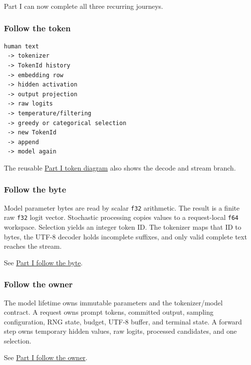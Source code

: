 \documentclass[
  10pt,
]{article}
\begin{document}
Part I can now complete all three recurring journeys.

\subsubsection{Follow the token}\label{follow-the-token-1}

\begin{verbatim}
human text
 -> tokenizer
 -> TokenId history
 -> embedding row
 -> hidden activation
 -> output projection
 -> raw logits
 -> temperature/filtering
 -> greedy or categorical selection
 -> new TokenId
 -> append
 -> model again
\end{verbatim}

The reusable
\href{https://github.com/hermonai/inside-the-llm-engine/blob/astra-visual-rewrite/diagrams/sampling/part1-follow-token.txt}{Part
I token diagram} also shows the decode and stream branch.

\subsubsection{Follow the byte}\label{follow-the-byte-1}

Model parameter bytes are read by scalar \texttt{f32} arithmetic. The
result is a finite raw \texttt{f32} logit vector. Stochastic processing
copies values to a request-local \texttt{f64} workspace. Selection
yields an integer token ID. The tokenizer maps that ID to bytes, the
UTF-8 decoder holds incomplete suffixes, and only valid complete text
reaches the stream.

See
\href{https://github.com/hermonai/inside-the-llm-engine/blob/astra-visual-rewrite/diagrams/sampling/part1-follow-byte.txt}{Part
I follow the byte}.

\subsubsection{Follow the owner}\label{follow-the-owner-1}

The model lifetime owns immutable parameters and the tokenizer/model
contract. A request owns prompt tokens, committed output, sampling
configuration, RNG state, budget, UTF-8 buffer, and terminal state. A
forward step owns temporary hidden values, raw logits, processed
candidates, and one selection.

See
\href{https://github.com/hermonai/inside-the-llm-engine/blob/astra-visual-rewrite/diagrams/sampling/part1-follow-owner.txt}{Part
I follow the owner}.
\end{document}
